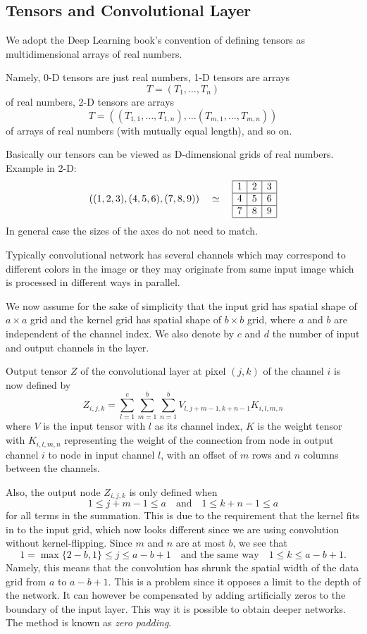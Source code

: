 \documentclass[]{article}
\begin{document}
\subsection{Tensors and Convolutional Layer}
We adopt the Deep Learning book's convention of defining tensors as
multidimensional arrays of real numbers.

Namely, 0-D tensors are just real numbers, 1-D tensors are arrays
\[
T = (T_1, \ldots, T_n)
\]
of real numbers, 2-D tensors are arrays
\[
T = ((T_{1,1}, \ldots, T_{1,n}), \ldots (T_{m,1}, \ldots, T_{m,n}))
\]
of arrays of real numbers (with mutually equal length), and so on.

Basically our tensors can be viewed as D-dimensional grids of real numbers.
Example in 2-D:
\[
((1, 2, 3), (4, 5, 6), (7, 8, 9)) \quad \simeq \quad
\begin{array}{|c|c|c|}
  \hline
  1 & 2 & 3 \\
  \hline
  4 & 5 & 6 \\
  \hline
  7 & 8 & 9 \\
  \hline
\end{array}
\]
In general case the sizes of the axes do not need to match.

Typically convolutional network has several channels which may correspond to different
colors in the image or they may originate from same input image which is processed
in different ways in parallel.

We now assume for the sake of simplicity that the input grid has spatial shape of
$a \times a$ grid and the kernel grid has spatial shape of $b \times b$ grid, where
$a$ and $b$ are independent of the channel index. We also denote by $c$ and $d$
the number of input and output channels in the layer.

Output tensor $Z$ of the convolutional layer at pixel $(j, k)$ of the channel $i$
is now defined by
\[
Z_{i, j, k} = \sum_{l=1}^c \sum_{m = 1}^b \sum_{n=1}^b
V_{l, j + m -1, k + n -1} K_{i, l, m, n}
\]
where $V$ is the input tensor with $l$ as its channel index, $K$ is the weight tensor with
$K_{i, l, m, n}$ representing the weight of the connection from node in output
channel $i$ to node in input channel $l$, with an offset of $m$ rows and $n$ columns
between the channels.

Also, the output node $Z_{i, j, k}$ is only defined when
\[
1 \le j + m - 1 \le a \quad \text{and} \quad 1 \le k + n - 1 \le a
\]
for all terms in the summation. This is due to the requirement that the kernel fits
in to the input grid, which now looks different since we are using convolution
without kernel-flipping. Since $m$ and $n$ are at most $b$, we see that
\[
1 = \max\{2 - b, 1\} \le j \le a - b + 1\quad \text{and the same way} \quad 1 \le k \le a - b + 1.
\]
Namely, this means that the convolution has shrunk the spatial width of the data grid
from $a$ to $a - b + 1$. This is a problem since it opposes a limit to the depth of
the network. It can however be compensated by adding artificially zeros to the
boundary of the input layer. This way it is possible to obtain deeper networks. The
method is known as \emph{zero padding}.
\end{document}
